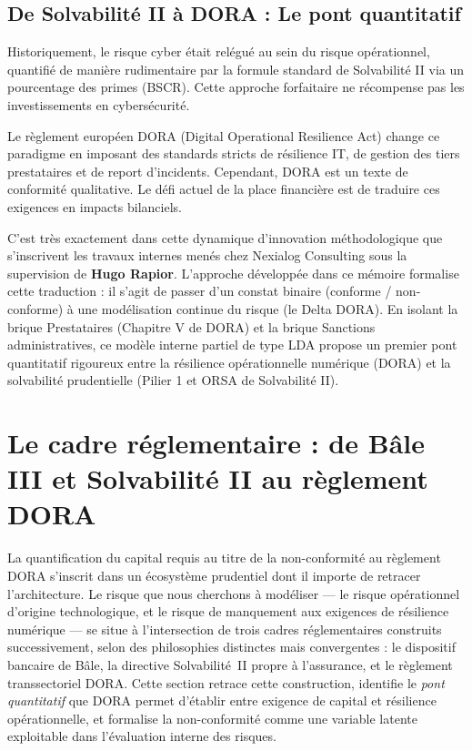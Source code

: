 \documentclass[11pt,a4paper]{article}
\theoremstyle{navystyle}
\theoremstyle{navydef}
\begin{document}
\subsection{De Solvabilité II à DORA : Le pont quantitatif}

Historiquement, le risque cyber était relégué au sein du \og risque opérationnel\fg{}, quantifié de manière rudimentaire par la formule standard de Solvabilité II via un pourcentage des primes (BSCR). Cette approche \og forfaitaire\fg{} ne récompense pas les investissements en cybersécurité. 

Le règlement européen DORA (Digital Operational Resilience Act) change ce paradigme en imposant des standards stricts de résilience IT, de gestion des tiers prestataires et de report d'incidents. Cependant, DORA est un texte de conformité qualitative. Le défi actuel de la place financière est de traduire ces exigences en impacts bilanciels. 

C'est très exactement dans cette dynamique d'innovation méthodologique que s'inscrivent les travaux internes menés chez Nexialog Consulting sous la supervision de \textbf{Hugo Rapior}. L'approche développée dans ce mémoire formalise cette traduction : il s'agit de passer d'un constat binaire (conforme / non-conforme) à une modélisation continue du risque (le Delta DORA). En isolant la brique \og Prestataires\fg{} (Chapitre V de DORA) et la brique \og Sanctions\fg{} administratives, ce modèle interne partiel de type LDA propose un premier pont quantitatif rigoureux entre la résilience opérationnelle numérique (DORA) et la solvabilité prudentielle (Pilier 1 et ORSA de Solvabilité II).

\section{Le cadre réglementaire : de Bâle III et Solvabilité II au règlement DORA}

La quantification du capital requis au titre de la non-conformité au règlement DORA
s'inscrit dans un écosystème prudentiel dont il importe de retracer l'architecture.
Le risque que nous cherchons à modéliser --- le risque opérationnel d'origine
technologique, et le risque de manquement aux exigences de résilience numérique ---
se situe à l'intersection de trois cadres réglementaires construits successivement,
selon des philosophies distinctes mais convergentes : le dispositif bancaire de Bâle,
la directive Solvabilité~II propre à l'assurance, et le règlement transsectoriel DORA.
Cette section retrace cette construction, identifie le \emph{pont quantitatif} que DORA
permet d'établir entre exigence de capital et résilience opérationnelle, et formalise la
non-conformité comme une variable latente exploitable dans l'évaluation interne des risques.
\end{document}
